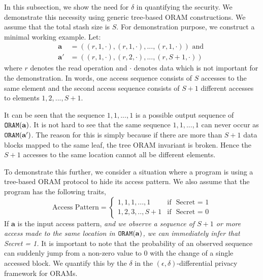 \documentclass[USenglish,oneside,twocolumn]{article}
\begin{document}
In this subsection, we show the need for $\delta$ in quantifying the security. We demonstrate this necessity using generic tree-based ORAM constructions. We assume that the total stash size is $S$.
For demonstration purpose, we construct a minimal working example. Let: 
\begin{equation}
\begin{aligned}
\mathbf{a} &= \mathit{((r,1,\cdot),(r,1,\cdot),. . . , (r, 1, \cdot))}  \mbox{ and }\\
\mathbf{a}' &= \mathit{((r,1,\cdot),(r,2,\cdot),. . . , (r, S+1, \cdot))}
\end{aligned}
\end{equation}
where $r$ denotes the read operation and $\cdot$ denotes data which is not important for the demonstration. In words, one access sequence consists of $S$ accesses to the same element and the second access sequence consists of $S+1$ different accesses to elements $1,2, . . . ,S+1$. 

It can be seen that the sequence $1,1,. .  .,1$ is a possible output sequence of ${\tt ORAM}(\mathbf{a})$. 
It is not hard to see that the same sequence $1,1,. . .,1$ can never occur as ${\tt ORAM}(\mathbf{a}')$. The reason for this is simply because if there are more than $S+1$ data blocks mapped to the same leaf, the tree ORAM invariant is broken. Hence the $S+1$ accesses to the same location cannot all be different elements. 

To demonstrate this further, we consider a situation where a program is using a tree-based ORAM protocol to hide its access pattern. We also assume that the program has the following traits,
\[
\mbox{Access Pattern} = \begin{cases} 1,1,1,. . .,1 & \mbox{if } \mbox{ Secret = 1} \\ 
																 1,2,3, . . ,S+1 & \mbox{if } \mbox{ Secret = 0} 
																 \end{cases}
\]
If $\mathbf{a}$ is the input access pattern, \textit{and we observe a sequence of $S+1$ or more access made to the same location in ${\tt ORAM}(\mathbf{a})$, we can immediately infer that Secret = 1.} 
It is important to note that the probability of an observed sequence can suddenly jump from a non-zero value to 0 with the change of a single accessed block. We quantify this by the $\delta$ in the $(\epsilon,\delta)$-differential privacy framework for ORAMs. 
\end{document}
